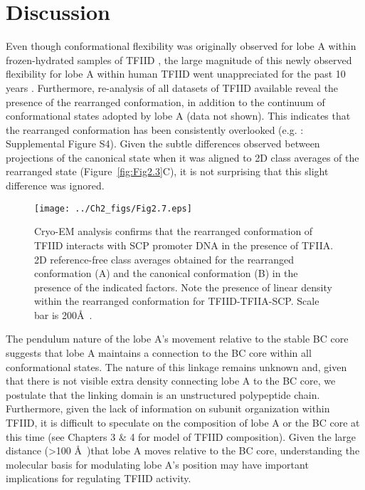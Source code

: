 \section{Discussion}
Even though conformational flexibility was originally observed for lobe A within frozen-hydrated samples of TFIID \cite{Grob_1281}, the large magnitude of this newly observed flexibility for lobe A within human TFIID went unappreciated for the past 10 years \cite{Andel_2407,Grob_1281,Liu_723,Liu_574}. Furthermore, re-analysis of all datasets of TFIID available reveal the presence of the rearranged conformation, in addition to the continuum of conformational states adopted by lobe A (data not shown). This indicates that the rearranged conformation has been consistently overlooked (e.g. \cite{Liu_723}: Supplemental Figure S4). Given the subtle differences observed between projections of the canonical state when it was aligned to 2D class averages of the rearranged state (Figure~\ref{fig:Fig2.3}C), it is not surprising that this slight difference was ignored.\\
\begin{figure}
\centering
\texttt{[image: ../Ch2\_figs/Fig2.7.eps]}
\caption[Cryo-EM analysis confirms that the rearranged conformation of TFIID interacts with SCP promoter DNA in the presence of TFIIA]{Cryo-EM analysis confirms that the rearranged conformation of TFIID interacts with SCP promoter DNA in the presence of TFIIA. 2D reference-free class averages obtained for the rearranged conformation (A) and the canonical conformation (B) in the presence of the indicated factors.  Note the presence of linear density within the rearranged conformation for TFIID-TFIIA-SCP.  Scale bar is 200\AA\ .}
\label{fig:Fig2.7}
\end{figure}
\indent The pendulum nature of the lobe A's movement relative to the stable BC core suggests that lobe A maintains a connection to the BC core within all conformational states. The nature of this linkage remains unknown and, given that there is not visible extra density connecting lobe A to the BC core, we postulate that the linking domain is an unstructured polypeptide chain. Furthermore, given the lack of information on subunit organization within TFIID, it is difficult to speculate on the composition of lobe A or the BC core at this time (see Chapters 3 \& 4 for model of TFIID composition). Given the large distance (\textgreater 100 \AA\ )that lobe A moves relative to the BC core, understanding the molecular basis for modulating lobe A's position may have important implications for regulating TFIID activity.   \\ 
